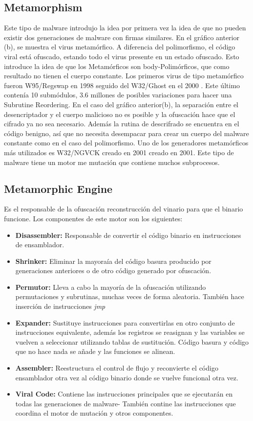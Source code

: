 \documentclass[15pt]{article}
\begin{document}
	\subsection{Metamorphism}
	Este tipo de malware introdujo la idea por primera vez la idea de que no pueden existir dos generaciones de malware con firmas similares. En el gráfico anterior (b), se muestra el virus metamórfico. A diferencia del polimorfismo, el código viral está ofuscado, estando todo el virus presente en un estado ofuscado. Esto introduce la idea de que los Metamórficos son body-Polimórficos, que como resultado no tienen el cuerpo constante. Los primeros virus de tipo metamórfico fueron W95/Regswap en 1998 \cite{regswap} seguido del W32/Ghost en el 2000 \cite{ghost}. Este último contenía 10 submódulos, 3.6 millones de posibles variaciones para hacer una Subrutine Reordering. En el caso del gráfico anterior(b), la separación entre el desencriptador y el cuerpo malicioso no es posible y la ofuscación  hace que el cifrado ya no sea necesario. Además la rutina de descrifrado se encuentra en el código benigno, así que no necesita desempacar para crear un cuerpo del malware constante como en el caso del polimorfismo. Uno de los generadores metamórficos más utilizados es W32/NGVCK creado en 2001 \cite{ngvck} creado en 2001. Este tipo de malware tiene un motor me mutación que contiene muchos subprocesos.
	
	\subsection{Metamorphic Engine}
	Es el responsable de la ofuscación reconstrucción del vinario para que el binario funcione. Los componentes de este motor son los siguientes:
	\begin{itemize}
		\item \textbf{Disassembler:} Responsable de convertir el código binario en instrucciones de ensamblador.
		\item \textbf{Shrinker:} Eliminar la mayoraía del código basura producido por generaciones anteriores o de otro código generado por ofuscación.
		\item \textbf{Permutor:} Lleva a cabo la mayoría de la ofuscación utilizando permutaciones y subrutinas, muchas veces de forma aleatoria. También hace inserción de instrucciones \textit{jmp}
		\item \textbf{Expander:} Sustituye instrucciones para convertirlas en otro conjunto de instrucciones equivalente, además los registros se reasignan y las variables se vuelven a seleccionar utilizando tablas de sustitución. Código basura y código que no hace nada se añade y las funciones se alinean.
		\item \textbf{Assembler:} Reestructura el control de flujo y reconvierte el código ensamblador otra vez al código binario donde se vuelve funcional otra vez.
		\item \textbf{Viral Code:} Contiene las instrucciones principales que se ejecutarán en todas las generaciones de malware- También contine las instrucciones que coordina el motor de mutación y otros componentes.    
	\end{itemize}
\end{document}
